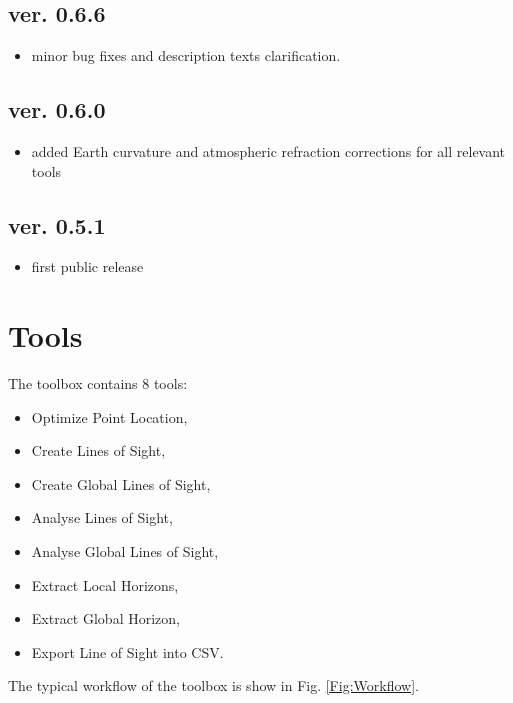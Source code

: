 \documentclass[]{article}
\begin{document}
\subsection*{ver. 0.6.6}
\begin{itemize}
	\item minor bug fixes and description texts clarification.
\end{itemize}

\subsection*{ver. 0.6.0}
\begin{itemize}
	\item added Earth curvature and atmospheric refraction corrections for all relevant tools
\end{itemize}

\subsection*{ver. 0.5.1}
\begin{itemize}
	\item first public release
\end{itemize}

\section{Tools}

The toolbox contains 8 tools:
\begin{itemize}
	\item Optimize Point Location,
	\item Create Lines of Sight,
	\item Create Global Lines of Sight,
	\item Analyse Lines of Sight,
	\item Analyse Global Lines of Sight,
	\item Extract Local Horizons,
	\item Extract Global Horizon,
	\item Export Line of Sight into CSV.
\end{itemize}
The typical workflow of the toolbox is show in Fig. \ref{Fig:Workflow}.
\end{document}
